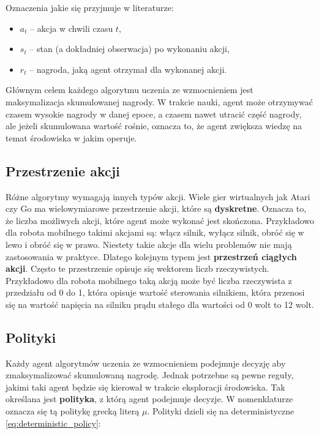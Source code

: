 Oznaczenia jakie się przyjmuje w literaturze:

\begin{itemize}
	\item $a_{t}$ -- akcja w chwili czasu $t$,
	\item $s_{t}$ -- stan (a dokładniej obserwacja) po wykonaniu akcji,
	\item $r_{t}$ -- nagroda, jaką agent otrzymał dla wykonanej akcji.
\end{itemize}

Głównym celem każdego algorytmu uczenia ze wzmocnieniem jest maksymalizacja 
skumulowanej nagrody. W trakcie nauki, agent może otrzymywać czasem wysokie 
nagrody w danej epoce, a czasem nawet utracić część nagrody, ale jeżeli 
skumulowana wartość rośnie, oznacza to, że agent zwiększa wiedzę na temat 
środowiska w jakim operuje.

\subsection{Przestrzenie akcji}

Różne algorytmy wymagają innych typów akcji. Wiele gier wirtualnych jak Atari 
czy Go ma wielowymiarowe przestrzenie akcji, które są \textbf{dyskretne}. 
Oznacza to, że liczba możliwych akcji, które agent może wykonać jest skończona. 
Przykładowo dla robota mobilnego takimi akcjami są: włącz silnik, wyłącz 
silnik, obróć się w lewo i obróć się w prawo. Niestety takie akcje dla wielu 
problemów nie mają zastosowania w praktyce. Dlatego kolejnym typem jest 
\textbf{przestrzeń ciągłych akcji}. Często te przestrzenie opisuje się wektorem 
liczb rzeczywistych. Przykładowo dla robota mobilnego taką akcją może być 
liczba rzeczywista z przedziału od 0 do 1, która opisuje wartość sterowania 
silnikiem, która przenosi się na wartość napięcia na silniku prądu stałego dla 
wartości od 0 wolt to 12 wolt.

\subsection{Polityki}

Każdy agent algorytmów uczenia ze wzmocnieniem podejmuje decyzję aby 
zmaksymalizować skumulowaną nagrodę. Jednak potrzebne są pewne reguły, jakimi 
taki agent będzie się kierował w trakcie eksploracji środowiska. Tak określana 
jest \textbf{polityka}, z którą agent podejmuje decyzje. W nomenklaturze 
oznacza się tą politykę grecką literą $\mu$. Polityki dzieli się na 
deterministyczne \ref{eq:deterministic_policy}:

